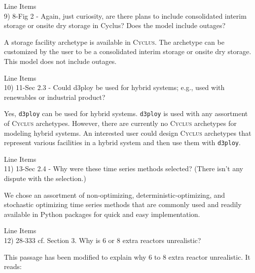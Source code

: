 \documentclass[answers,11pt]{exam}
\newcommand{\Cyclus}{\textsc{Cyclus}\xspace}%
\newcommand{\deploy}{\texttt{d3ploy}\xspace}%
\begin{document}
\begin{questions}
\question Line Items \\
9) 8-Fig 2 - Again, just curiosity, are there plans to include consolidated interim storage or onsite dry
storage in Cyclus? Does the model include outages?

\begin{solution}
A storage facility archetype is available in \Cyclus. The archetype can be customized by the user to be a 
consolidated interim storage or onsite dry storage. This model does not include outages. 
\end{solution}

\question Line Items \\
10) 11-Sec 2.3 - Could d3ploy be used for hybrid systems; e.g., used with renewables or industrial product?

\begin{solution}
Yes, \deploy can be used for hybrid systems. \deploy is used with any assortment of 
\Cyclus archetypes. However, there are currently no \Cyclus archetypes for modeling hybrid 
systems. An interested user could design \Cyclus archetypes that represent various facilities 
in a hybrid system and then use them with \deploy.
\end{solution}

\question Line Items \\
11) 13-Sec 2.4 - Why were these time series methods selected? (There isn’t any dispute with the selection.)

\begin{solution}
We chose an assortment of non-optimizing, deterministic-optimizing, and stochastic 
optimizing time series methods that are commonly used and readily available in Python 
packages for quick and easy implementation. 
\end{solution}

\question Line Items \\
12) 28-333 cf. Section 3. Why is 6 or 8 extra reactors unrealistic?

\begin{solution}
This passage has been modified to explain why 6 to 8 extra 
reactor unrealistic. It reads: 


\end{solution}
\end{questions}
\end{document}
